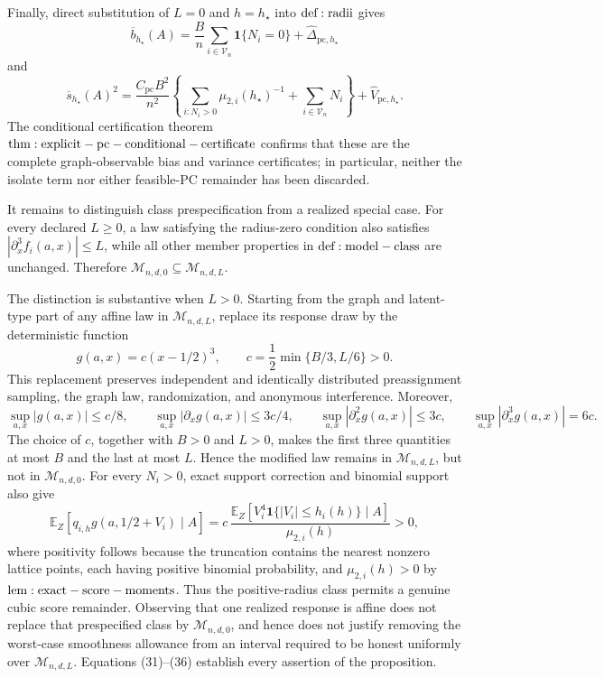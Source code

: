 Finally, direct substitution of \(L=0\) and \(h=h_\star\) into \({\rm def:radii}\) gives
\[
 \overline b_{h_\star}(A)
 =\frac Bn\sum_{i\in\mathcal V_n}\mathbf1\{N_i=0\}
  +\widehat\Delta_{\mathrm{pc},h_\star}
\tag{35}
\]
and
\[
 \overline s_{h_\star}(A)^2
 =\frac{C_{\mathrm{pc}}B^2}{n^2}
 \left\{\sum_{i:N_i>0}\mu_{2,i}(h_\star)^{-1}
       +\sum_{i\in\mathcal V_n}N_i\right\}
 +\widehat V_{\mathrm{pc},h_\star}.
\tag{36}
\]
The conditional certification theorem \({\rm thm:explicit-pc-conditional-certificate}\) confirms that these are the complete graph-observable bias and variance certificates; in particular, neither the isolate term nor either feasible-PC remainder has been discarded.

It remains to distinguish class prespecification from a realized special case.  For every declared \(L\geq0\), a law satisfying the radius-zero condition also satisfies \(|\partial_x^3f_i(a,x)|\leq L\), while all other member properties in \({\rm def:model-class}\) are unchanged.  Therefore \(\mathcal M_{n,d,0}\subseteq\mathcal M_{n,d,L}\).

The distinction is substantive when \(L>0\).  Starting from the graph and latent-type part of any affine law in \(\mathcal M_{n,d,L}\), replace its response draw by the deterministic function
\[
 g(a,x)=c(x-1/2)^3,
 \qquad
 c=\frac12\min\{B/3,L/6\}>0.
\]
This replacement preserves independent and identically distributed preassignment sampling, the graph law, randomization, and anonymous interference.  Moreover,
\[
 \sup_{a,x}|g(a,x)|\leq c/8,\qquad
 \sup_{a,x}|\partial_xg(a,x)|\leq3c/4,\qquad
 \sup_{a,x}|\partial_x^2g(a,x)|\leq3c,\qquad
 \sup_{a,x}|\partial_x^3g(a,x)|=6c.
\]
The choice of \(c\), together with \(B>0\) and \(L>0\), makes the first three quantities at most \(B\) and the last at most \(L\).  Hence the modified law remains in \(\mathcal M_{n,d,L}\), but not in \(\mathcal M_{n,d,0}\).  For every \(N_i>0\), exact support correction and binomial support also give
\[
 \mathbb E_Z[q_{i,h}g(a,1/2+V_i)\mid A]
 =c\,\frac{\mathbb E_Z[V_i^4\mathbf1\{|V_i|\leq h_i(h)\}\mid A]}
              {\mu_{2,i}(h)}
 >0,
\]
where positivity follows because the truncation contains the nearest nonzero lattice points, each having positive binomial probability, and \(\mu_{2,i}(h)>0\) by \({\rm lem:exact-score-moments}\).  Thus the positive-radius class permits a genuine cubic score remainder.  Observing that one realized response is affine does not replace that prespecified class by \(\mathcal M_{n,d,0}\), and hence does not justify removing the worst-case smoothness allowance from an interval required to be honest uniformly over \(\mathcal M_{n,d,L}\).  Equations (31)--(36) establish every assertion of the proposition.